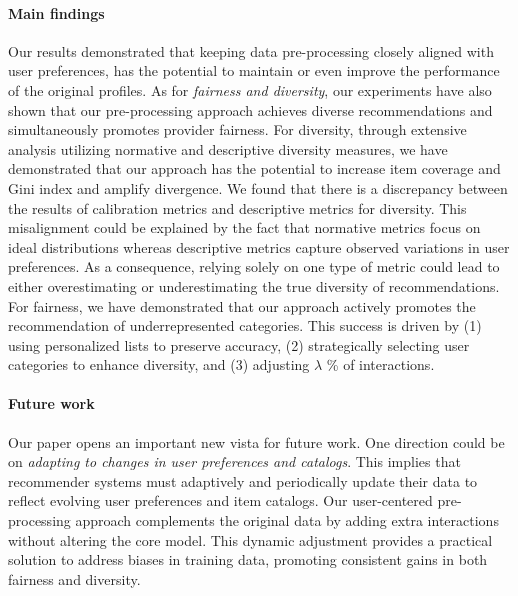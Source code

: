 \documentclass[runningheads]{llncs}
\begin{document}
\paragraph{Main findings} 
Our results demonstrated that keeping data pre-processing closely aligned with user preferences, has the potential to maintain or even improve the performance of the original profiles. 
As for \textit{fairness and diversity}, our experiments have also shown that our pre-processing approach achieves diverse recommendations and simultaneously promotes provider fairness. 
For diversity, through extensive analysis utilizing normative and descriptive diversity measures, we have demonstrated that our approach has the potential to increase item coverage and Gini index and amplify divergence. 
We found that there is a discrepancy between the results of calibration metrics and descriptive metrics for diversity. 
This misalignment could be explained by the fact that normative metrics focus on ideal distributions whereas descriptive metrics capture observed variations in user preferences. 
As a consequence, relying solely on one type of metric could lead to either overestimating or underestimating the true diversity of recommendations.
For fairness, we have demonstrated that our approach actively promotes the recommendation of underrepresented categories. 
This success is driven by (1) using personalized lists to preserve accuracy, (2) strategically selecting user categories to enhance diversity, and (3) adjusting $\lambda$ \% of interactions.


\paragraph{Future work} 
Our paper opens an important new vista for future work. One direction could be on \textit{adapting to changes in user preferences and catalogs}. 
This implies that recommender systems must adaptively and periodically update their data to reflect evolving user preferences and item catalogs. 
Our user-centered pre-processing approach complements the original data by adding extra interactions without altering the core model. 
This dynamic adjustment provides a practical solution to address biases in training data, promoting consistent gains in both fairness and diversity.
\end{document}
